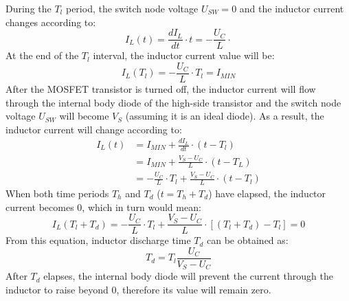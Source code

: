 During the $T_l$ period, the switch node voltage $U_{SW} = 0$ and the inductor current changes according to:
\begin{equation}
    I_L(t) = \frac{dI_L}{dt} \cdot t = -\frac{U_C}{L} \cdot
\end{equation}
At the end of the $T_l$ interval, the inductor current value will be:
\begin{equation}
I_L(T_l) = -\frac{U_C}{L} \cdot T_l = I_{MIN}
\end{equation}
After the MOSFET transistor is turned off, the inductor current will flow through the internal body diode of the high-side transistor and the switch node voltage $U_{SW}$ will become $V_S$ (assuming it is an ideal diode).
As a result, the inductor current will change according to:
\begin{equation}
    \begin{split}
        I_L(t) &= I_{MIN} + \frac{dI_L}{dt} \cdot (t - T_l) \\
        &= I_{MIN} + \frac{V_S - U_C}{L} \cdot (t - T_L) \\
        &= -\frac{U_C}{L} \cdot T_l + \frac{V_S - U_C}{L} \cdot (t - T_l)
    \end{split}
\end{equation}
When both time periods $T_h$ and $T_d$ ($t = T_h + T_d$) have elapsed, the inductor current becomes 0, which in turn would mean:
\begin{equation}
    I_L(T_l + T_d) = -\frac{U_C}{L} \cdot T_l + \frac{V_S - U_C}{L} \cdot [(T_l + T_d) - T_l] = 0
\end{equation}
From this equation, inductor discharge time $T_d$ can be obtained as:
\begin{equation}
    T_d = T_l \frac{U_C}{V_S - U_C}
\end{equation}
After $T_d$ elapses, the internal body diode will prevent the current through the inductor to raise beyond 0, therefore its value will remain zero.

